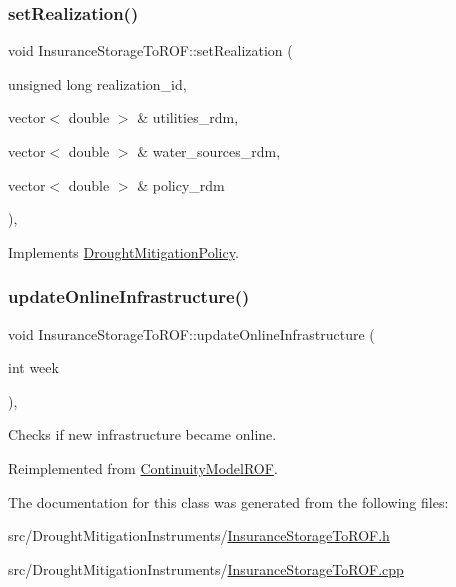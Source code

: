 \subsubsection{\texorpdfstring{set\+Realization()}{setRealization()}}
{\footnotesize\ttfamily void Insurance\+Storage\+To\+R\+O\+F\+::set\+Realization (\begin{DoxyParamCaption}\item[{unsigned long}]{realization\+\_\+id,  }\item[{vector$<$ double $>$ \&}]{utilities\+\_\+rdm,  }\item[{vector$<$ double $>$ \&}]{water\+\_\+sources\+\_\+rdm,  }\item[{vector$<$ double $>$ \&}]{policy\+\_\+rdm }\end{DoxyParamCaption})\hspace{0.3cm}{\ttfamily [override]}, {\ttfamily [virtual]}}



Implements \mbox{\hyperlink{classDroughtMitigationPolicy_a5d2033543cacca1e412eebef5106eab4}{Drought\+Mitigation\+Policy}}.

\mbox{\label{classInsuranceStorageToROF_a5870934b8b33e1d872eca7b0940398ac}} 
\subsubsection{\texorpdfstring{update\+Online\+Infrastructure()}{updateOnlineInfrastructure()}}
{\footnotesize\ttfamily void Insurance\+Storage\+To\+R\+O\+F\+::update\+Online\+Infrastructure (\begin{DoxyParamCaption}\item[{int}]{week }\end{DoxyParamCaption})\hspace{0.3cm}{\ttfamily [override]}, {\ttfamily [virtual]}}

Checks if new infrastructure became online. 

Reimplemented from \mbox{\hyperlink{classContinuityModelROF_af09f22c4fd69db45d3c8962713801287}{Continuity\+Model\+R\+OF}}.



The documentation for this class was generated from the following files\+:\begin{DoxyCompactItemize}
\item 
src/\+Drought\+Mitigation\+Instruments/\mbox{\hyperlink{InsuranceStorageToROF_8h}{Insurance\+Storage\+To\+R\+O\+F.\+h}}\item 
src/\+Drought\+Mitigation\+Instruments/\mbox{\hyperlink{InsuranceStorageToROF_8cpp}{Insurance\+Storage\+To\+R\+O\+F.\+cpp}}\end{DoxyCompactItemize}
